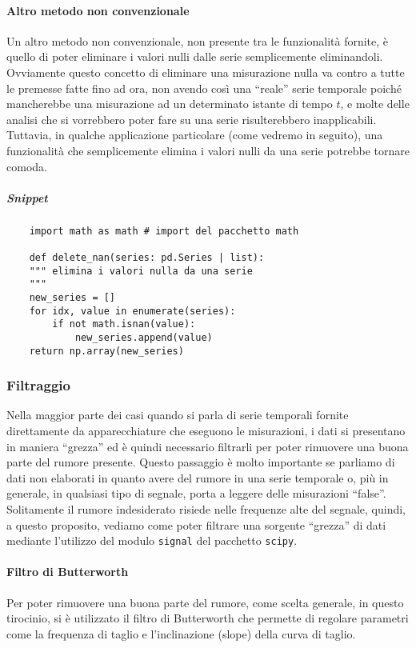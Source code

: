 \paragraph{Altro metodo non convenzionale}
Un altro metodo non convenzionale, non presente tra le funzionalità fornite,
è quello di poter eliminare i valori nulli dalle serie semplicemente
eliminandoli. Ovviamente questo concetto di eliminare una misurazione nulla va
contro a tutte le premesse fatte fino ad ora, non avendo così una ``reale''
serie temporale poiché mancherebbe una misurazione ad un determinato istante di tempo
$t$, e molte delle analisi che si vorrebbero poter fare su una serie risulterebbero
inapplicabili. 
Tuttavia, in qualche applicazione particolare (come vedremo in seguito), una funzionalità
che semplicemente elimina i valori nulli da una serie potrebbe tornare comoda.
\subparagraph*{Snippet}
\begin{verbatim}
    import math as math # import del pacchetto math

    def delete_nan(series: pd.Series | list):
    """ elimina i valori nulla da una serie
    """
    new_series = []
    for idx, value in enumerate(series):
        if not math.isnan(value):
            new_series.append(value)
    return np.array(new_series)
\end{verbatim}


\subsubsection{Filtraggio}
Nella maggior parte dei casi quando si parla di serie temporali fornite direttamente 
da apparecchiature che eseguono le misurazioni, i dati si presentano in maniera
``grezza'' ed è quindi necessario filtrarli per poter rimuovere una buona parte
del rumore presente. Questo passaggio è molto importante se parliamo di dati non elaborati
in quanto avere del rumore in una serie temporale o, più in generale, in qualsiasi
tipo di segnale, porta a leggere delle misurazioni ``false''. Solitamente il rumore
indesiderato risiede nelle frequenze alte del segnale, quindi, a questo proposito,
vediamo come poter filtrare una sorgente ``grezza'' di dati mediante l'utilizzo del
modulo \texttt{signal} del pacchetto \texttt{scipy}.

\paragraph{Filtro di Butterworth}
Per poter rimuovere una buona parte del rumore, come scelta generale, in questo tirocinio,
si è utilizzato il filtro di Butterworth che permette di regolare parametri come la 
frequenza di taglio e l'inclinazione (slope) della curva di taglio.

